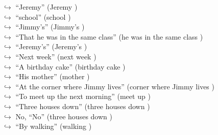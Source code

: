 \documentclass[11pt,a4paper, onecolumn]{article}
\begin{document}
\begin{figure}[t] \small \begin{tcolorbox}[boxsep=0pt,left=5pt,right=0pt,top=2pt,colback = yellow!5] \begin{dialogue}
 \small 
\colorbox{pink!25}{$\hookrightarrow$}
{ ``Jeremy'' (Jeremy ) }
\\
\colorbox{pink!25}{$\hookrightarrow$}
{ ``school'' (school ) }
\\
\colorbox{pink!25}{$\hookrightarrow$}
{ ``Jimmy's'' (Jimmy's ) }
\\
\colorbox{pink!25}{$\hookrightarrow$}
{ ``That he was in the same class'' (he was in the same class ) }
\\
\colorbox{pink!25}{$\hookrightarrow$}
{ ``Jeremy's'' (Jeremy's ) }
\\
\colorbox{pink!25}{$\hookrightarrow$}
{ ``Next week'' (next week ) }
\\
\colorbox{pink!25}{$\hookrightarrow$}
{ ``A birthday cake'' (birthday cake ) }
\\
\colorbox{pink!25}{$\hookrightarrow$}
{ ``His mother'' (mother ) }
\\
\colorbox{pink!25}{$\hookrightarrow$}
{ ``At the corner where Jimmy lives'' (corner where Jimmy lives ) }
\\
\colorbox{pink!25}{$\hookrightarrow$}
{ ``To meet up the next morning'' (meet up ) }
\\
\colorbox{pink!25}{$\hookrightarrow$}
{ ``Three houses down'' (three houses down ) }
\\
\colorbox{pink!25}{$\hookrightarrow$}
\colorbox{red!25}{No,}
{ ``No'' (three houses down ) }
\\
\colorbox{pink!25}{$\hookrightarrow$}
{ ``By walking'' (walking ) }
\\
 \end{dialogue}\end{tcolorbox}\end{figure}
\end{document}
